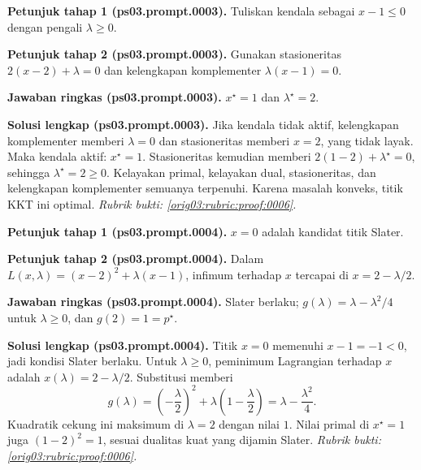 \par\noindent\textbf{Petunjuk tahap 1 (ps03.prompt.0003).}
Tuliskan kendala sebagai $x-1\leq0$ dengan pengali $\lambda\geq0$.
\label{orig03:ps03:hint1:0003}
\par\noindent\textbf{Petunjuk tahap 2 (ps03.prompt.0003).}
Gunakan stasioneritas $2(x-2)+\lambda=0$ dan
kelengkapan komplementer $\lambda(x-1)=0$.
\label{orig03:ps03:hint2:0003}
\par\noindent\textbf{Jawaban ringkas (ps03.prompt.0003).}
$x^\star=1$ dan $\lambda^\star=2$.
\label{orig03:ps03:answer:0003}
\par\noindent\textbf{Solusi lengkap (ps03.prompt.0003).}
Jika kendala tidak aktif, kelengkapan komplementer memberi $\lambda=0$ dan
stasioneritas memberi $x=2$, yang tidak layak. Maka kendala aktif:
$x^\star=1$. Stasioneritas kemudian memberi
$2(1-2)+\lambda^\star=0$, sehingga $\lambda^\star=2\geq0$.
Kelayakan primal, kelayakan dual, stasioneritas, dan kelengkapan komplementer
semuanya terpenuhi. Karena masalah konveks, titik KKT ini optimal.
\emph{Rubrik bukti: \ref{orig03:rubric:proof:0006}.}
\label{orig03:ps03:solution:0003}

\par\noindent\textbf{Petunjuk tahap 1 (ps03.prompt.0004).}
$x=0$ adalah kandidat titik Slater.
\label{orig03:ps03:hint1:0004}
\par\noindent\textbf{Petunjuk tahap 2 (ps03.prompt.0004).}
Dalam $L(x,\lambda)=(x-2)^2+\lambda(x-1)$, infimum terhadap $x$ tercapai
di $x=2-\lambda/2$.
\label{orig03:ps03:hint2:0004}
\par\noindent\textbf{Jawaban ringkas (ps03.prompt.0004).}
Slater berlaku; $g(\lambda)=\lambda-\lambda^2/4$ untuk $\lambda\geq0$, dan
$g(2)=1=p^\star$.
\label{orig03:ps03:answer:0004}
\par\noindent\textbf{Solusi lengkap (ps03.prompt.0004).}
Titik $x=0$ memenuhi $x-1=-1<0$, jadi kondisi Slater berlaku. Untuk
$\lambda\geq0$, peminimum Lagrangian terhadap $x$ adalah
$x(\lambda)=2-\lambda/2$. Substitusi memberi
\[
 g(\lambda)=\left(-\frac\lambda2\right)^2
 +\lambda\left(1-\frac\lambda2\right)
 =\lambda-\frac{\lambda^2}{4}.
\]
Kuadratik cekung ini maksimum di $\lambda=2$ dengan nilai $1$. Nilai primal
di $x^\star=1$ juga $(1-2)^2=1$, sesuai dualitas kuat yang dijamin Slater.
\emph{Rubrik bukti: \ref{orig03:rubric:proof:0006}.}
\label{orig03:ps03:solution:0004}

